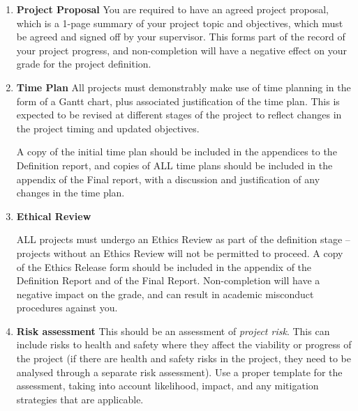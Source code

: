 \begin{enumerate}
    \item \textbf{Project Proposal}
    \subitem You are required to have an agreed project proposal, which is a 1-page summary of your project topic and objectives, which must be agreed and signed off by your supervisor. This forms part of the record of your project progress, and non-completion will have a negative effect on your grade for the project definition.

    \item \textbf{Time Plan}
    \subitem  All projects must demonstrably make use of time planning in the form of a Gantt chart, plus associated justification of the time plan. This is expected to be revised at different stages of the project to reflect changes in the project timing and updated objectives.

    A copy of the initial time plan should be included in the appendices to the Definition report, and copies of ALL time plans should be included in the appendix of the Final report, with a discussion and justification of any changes in the time plan.

    \item \textbf{Ethical Review}
    \subitem 

    ALL projects must undergo an Ethics Review as part of the definition stage – projects without an Ethics Review will not be permitted to proceed. A copy of the Ethics Release form should be included in the appendix of the Definition Report and of the Final Report. Non-completion will have a negative impact on the grade, and can result in academic misconduct procedures against you. 

    \item \textbf{Risk assessment}
    \subitem This should be an assessment of \textit{project risk}. This can include risks to health and safety where they affect the viability or progress of the project (if there are health and safety risks in the project, they need to be analysed through a separate risk assessment). Use a proper template for the assessment, taking into account likelihood, impact, and any mitigation strategies that are applicable. 
    

\end{enumerate}
